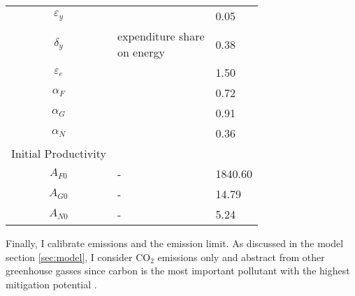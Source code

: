 \begin{table}[h!]
\begin{center}
\begin{tabular}{c|ll}
 			\hline
 			$\varepsilon_y$&\cite{Fried2018ClimateAnalysis}&0.05\\			
 			$\delta_y$&\makecell[l]{expenditure share \\ on energy \citep{EIAEnergy}}&0.38\\	
 			$\varepsilon_e$&&1.50\\	
 			$\alpha_F$&\cite{Fried2018ClimateAnalysis} &0.72\\
 			$\alpha_G$& &0.91\\
 			$\alpha_N$& &0.36 \\
 			\hline
 			\hline
 			Initial Productivity&\multicolumn{2}{c}{}\\
 			\hline
 			
 			\hline
 			$A_{F0}$&- &1840.60  \\
 			$A_{G0}$&- &14.79  \\
 			$A_{N0}$&- &5.24 \\
 			\hline \hline
 		\end{tabular}
 	\end{center}
 \end{table}

 
 
 Finally, I calibrate emissions and the emission limit. As discussed in the model section \ref{sec:model},  I consider CO$_2$ emissions only and abstract from other greenhouse gasses since carbon is the most important pollutant with the highest mitigation potential \citep[p.29]{IPCC2022}.
 
